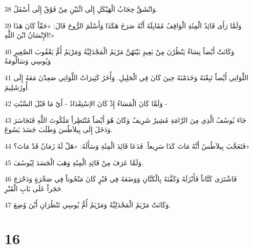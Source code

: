 \par 38 وَانْشَقَّ حِجَابُ الْهَيْكَلِ إِلَى اثْنَيْنِ مِنْ فَوْقُ إِلَى أَسْفَلُ.
\par 39 وَلَمَّا رَأَى قَائِدُ الْمِئَةِ الْوَاقِفُ مُقَابِلَهُ أَنَّهُ صَرَخَ هَكَذَا وَأَسْلَمَ الرُّوحَ قَالَ: «حَقّاً كَانَ هَذَا الإِنْسَانُ ابْنَ اللَّهِ!»
\par 40 وَكَانَتْ أَيْضاً نِسَاءٌ يَنْظُرْنَ مِنْ بَعِيدٍ بَيْنَهُنَّ مَرْيَمُ الْمَجْدَلِيَّةُ وَمَرْيَمُ أُمُّ يَعْقُوبَ الصَّغِيرِ وَيُوسِي وَسَالُومَةُ
\par 41 اللَّوَاتِي أَيْضاً تَبِعْنَهُ وَخَدَمْنَهُ حِينَ كَانَ فِي الْجَلِيلِ. وَأُخَرُ كَثِيرَاتٌ اللَّوَاتِي صَعِدْنَ مَعَهُ إِلَى أُورُشَلِيمَ.
\par 42 وَلَمَّا كَانَ الْمَسَاءُ إِذْ كَانَ الاِسْتِعْدَادُ - أَيْ مَا قَبْلَ السَّبْتِ -
\par 43 جَاءَ يُوسُفُ الَّذِي مِنَ الرَّامَةِ مُشِيرٌ شَرِيفٌ وَكَانَ هُوَ أَيْضاً مُنْتَظِراً مَلَكُوتَ اللَّهِ فَتَجَاسَرَ وَدَخَلَ إِلَى بِيلاَطُسَ وَطَلَبَ جَسَدَ يَسُوعَ.
\par 44 فَتَعَجَّبَ بِيلاَطُسُ أَنَّهُ مَاتَ كَذَا سَرِيعاً. فَدَعَا قَائِدَ الْمِئَةِ وَسَأَلَهُ: «هَلْ لَهُ زَمَانٌ قَدْ مَاتَ؟»
\par 45 وَلَمَّا عَرَفَ مِنْ قَائِدِ الْمِئَةِ وَهَبَ الْجَسَدَ لِيُوسُفَ.
\par 46 فَاشْتَرَى كَتَّاناً فَأَنْزَلَهُ وَكَفَّنَهُ بِالْكَتَّانِ وَوَضَعَهُ فِي قَبْرٍ كَانَ مَنْحُوتاً فِي صَخْرَةٍ وَدَحْرَجَ حَجَراً عَلَى بَابِ الْقَبْرِ.
\par 47 وَكَانَتْ مَرْيَمُ الْمَجْدَلِيَّةُ وَمَرْيَمُ أُمُّ يُوسِي تَنْظُرَانِ أَيْنَ وُضِعَ.

\chapter{16}

